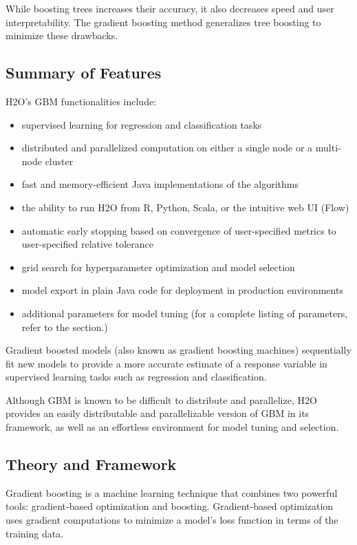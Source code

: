 While boosting trees increases their accuracy, it also decreases speed and user interpretability.
The gradient boosting method generalizes tree boosting to minimize these drawbacks.

\subsection{Summary of Features}
H2O's GBM functionalities include:

\begin{itemize}
\item supervised learning for regression and classification tasks
\item distributed and parallelized computation on either a single node or a multi-node cluster
\item fast and memory-efficient Java implementations of the algorithms
\item the ability to run H2O from R, Python, Scala, or the intuitive web UI (Flow)
\item automatic early stopping based on convergence of user-specified metrics to user-specified relative tolerance
\item grid search for hyperparameter optimization and model selection
\item model export in plain Java code for deployment in production environments
\item additional parameters for model tuning (for a complete listing of parameters, refer to the {\textbf{}} section.)
\end{itemize}


Gradient boosted models (also known as gradient boosting machines) sequentially fit new models to provide a more accurate estimate of a response variable in supervised learning tasks such as regression and classification. 

Although GBM is known to be difficult to distribute and parallelize, H2O provides an easily distributable and parallelizable version of GBM in its framework, as well as an effortless environment for model tuning and selection.


\subsection{Theory and Framework}

Gradient boosting is a machine learning technique that combines two powerful tools: gradient-based optimization and
boosting. Gradient-based optimization uses gradient computations to minimize a model's loss function in terms of
the training data. 

